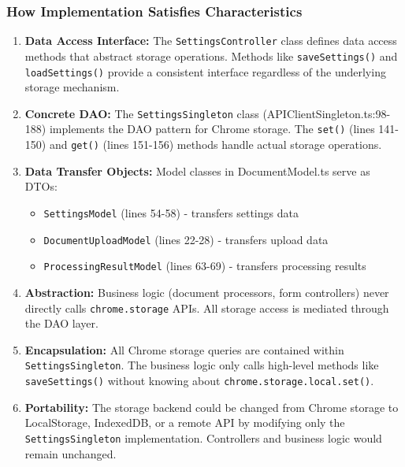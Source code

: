 \documentclass[11pt]{article}
\begin{document}
\subsubsection{How Implementation Satisfies Characteristics}

\begin{enumerate}[noitemsep]
    \item \textbf{Data Access Interface:} The \texttt{SettingsController} class defines data access methods that abstract storage operations. Methods like \texttt{saveSettings()} and \texttt{loadSettings()} provide a consistent interface regardless of the underlying storage mechanism.

    \item \textbf{Concrete DAO:} The \texttt{SettingsSingleton} class (APIClientSingleton.ts:98-188) implements the DAO pattern for Chrome storage. The \texttt{set()} (lines 141-150) and \texttt{get()} (lines 151-156) methods handle actual storage operations.

    \item \textbf{Data Transfer Objects:} Model classes in DocumentModel.ts serve as DTOs:
    \begin{itemize}[noitemsep]
        \item \texttt{SettingsModel} (lines 54-58) - transfers settings data
        \item \texttt{DocumentUploadModel} (lines 22-28) - transfers upload data
        \item \texttt{ProcessingResultModel} (lines 63-69) - transfers processing results
    \end{itemize}

    \item \textbf{Abstraction:} Business logic (document processors, form controllers) never directly calls \texttt{chrome.storage} APIs. All storage access is mediated through the DAO layer.

    \item \textbf{Encapsulation:} All Chrome storage queries are contained within \texttt{SettingsSingleton}. The business logic only calls high-level methods like \texttt{saveSettings()} without knowing about \texttt{chrome.storage.local.set()}.

    \item \textbf{Portability:} The storage backend could be changed from Chrome storage to LocalStorage, IndexedDB, or a remote API by modifying only the \texttt{SettingsSingleton} implementation. Controllers and business logic would remain unchanged.
\end{enumerate}
\end{document}
